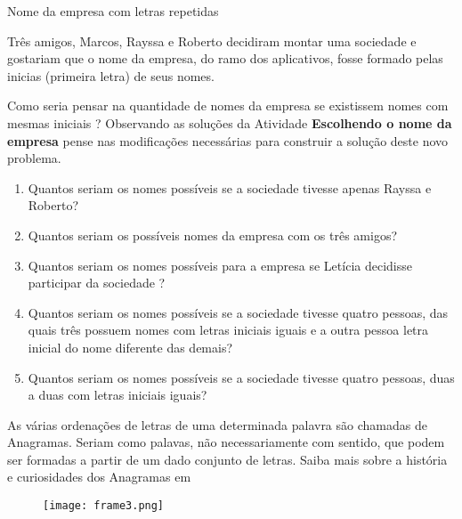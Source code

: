 \begin{task}{Nome da empresa com letras repetidas}


Três amigos, Marcos, Rayssa  e Roberto decidiram montar uma sociedade e gostariam que o nome da empresa, do ramo dos aplicativos, fosse formado pelas inicias (primeira letra) de seus nomes. 

Como seria pensar na quantidade de nomes da empresa se existissem nomes com mesmas iniciais ? Observando as soluções da Atividade \textbf{Escolhendo o nome da empresa} pense nas modificações necessárias para construir a solução deste novo problema.

\begin{enumerate}

    \item Quantos seriam os nomes possíveis se a sociedade tivesse apenas Rayssa e Roberto?
    \item Quantos seriam os possíveis nomes da empresa com os três amigos?
    \item Quantos seriam os nomes  possíveis para a empresa se Letícia decidisse participar da sociedade ?
    \item Quantos seriam os nomes possíveis se a sociedade tivesse quatro pessoas, das quais três possuem nomes com letras iniciais iguais e a outra pessoa letra inicial do nome diferente das demais?
    \item Quantos seriam os nomes possíveis se a sociedade tivesse quatro pessoas, duas a duas com letras iniciais iguais?
\end{enumerate}

\end{task}

\clearpage
\begin{knowledge}
As várias ordenações de letras de uma determinada palavra são chamadas de Anagramas. Seriam como palavas, não necessariamente com sentido, que podem ser formadas a partir de um dado conjunto de letras. Saiba mais sobre a história e curiosidades dos Anagramas em 
\begin{figure}[H]
\centering

\texttt{[image: frame3.png]} 
\end{figure}
\end{knowledge}

